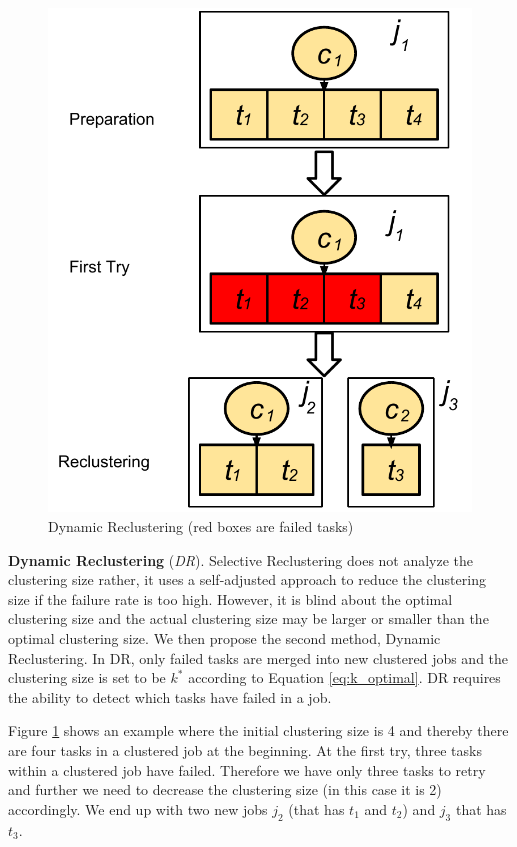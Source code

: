 \documentclass{IOS-Book-Article}
\begin{document}
\begin{figure}[!htb]
\centering
  \includegraphics[width=0.55\linewidth]{dr.pdf}
  \caption{Dynamic Reclustering (red boxes are failed tasks)}
  \label{fig:clustering_dr}
\end{figure}

\textbf{Dynamic Reclustering} (\emph{DR}). 
Selective Reclustering does not analyze the clustering size rather, it uses a self-adjusted approach to reduce the clustering size if the failure rate is too high. However, it is blind about the optimal clustering size and the actual clustering size may be larger or smaller than the optimal clustering size. We then propose the second method, Dynamic Reclustering. In DR, only failed tasks are merged into new clustered jobs and the clustering size is set to be $k^*$ according to Equation \ref{eq:k_optimal}. DR requires the ability to detect which tasks have failed in a job. 



Figure \ref{fig:clustering_dr} shows an example where the initial clustering size is 4 and thereby there are four tasks in a clustered job at the beginning. At the first try, three tasks within a clustered job have failed. Therefore we have only three tasks to retry and further we need to decrease the clustering size (in this case it is 2) accordingly. We end up with two new jobs $j_2$ (that has $t_1$ and $t_2$) and $j_3$ that has $t_3$. 
\end{document}

